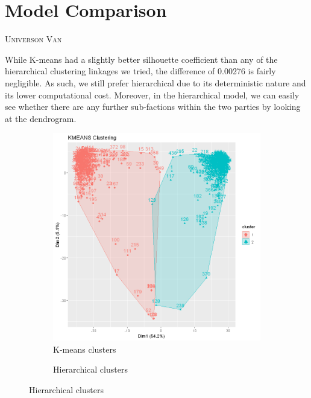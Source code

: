 \documentclass[12pt]{article}
\makeatletter
\newcommand{\chapterauthor}[1]{%
	{\parindent0pt\vspace*{-10pt}%
		\linespread{1.1}\large\scshape#1%
		\par\nobreak\vspace*{10pt}}
	\@afterheading%
}
\makeatother
\begin{document}
\section{Model Comparison}
\chapterauthor{Universon Van}
While K-means had a slightly better silhouette coefficient than any of the hierarchical clustering linkages we tried, the difference of 0.00276 is fairly negligible. As such, we still prefer hierarchical due to its deterministic nature and its lower computational cost. Moreover, in the hierarchical model, we can easily see whether there are any further sub-factions within the two parties by looking at the dendrogram. 
\begin{figure}[h]
	\centering
	\begin{subfigure}{.45\linewidth}
		\caption{K-means clusters}		
		\includegraphics[width=\textwidth]{Images/kmeans_cluster}
	\end{subfigure}
	\begin{subfigure}{.45\linewidth}
		\caption{Hierarchical clusters}		

\end{subfigure}
\end{figure}
\end{document}
